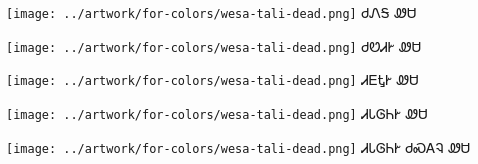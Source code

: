 \documentclass[avery5371,frame]{flashcards}%
\begin{document}
\begin{flashcard}{
\texttt{[image: ../artwork/for-colors/wesa-tali-dead.png]}
}
\Huge ᏧᏁᎦ ᏪᏌ
\end{flashcard}
\begin{flashcard}{
\texttt{[image: ../artwork/for-colors/wesa-tali-dead.png]}
}
\Huge ᏧᏬᏗᎨ ᏪᏌ
\end{flashcard}
\begin{flashcard}{
\texttt{[image: ../artwork/for-colors/wesa-tali-dead.png]}
}
\Huge ᏗᎬᎿᎨ ᏪᏌ
\end{flashcard}
\begin{flashcard}{
\texttt{[image: ../artwork/for-colors/wesa-tali-dead.png]}
}
\Huge ᏗᏓᎶᏂᎨ ᏪᏌ
\end{flashcard}
\begin{flashcard}{
\texttt{[image: ../artwork/for-colors/wesa-tali-dead.png]}
}
\Huge ᏗᏓᎶᏂᎨ ᏧᏍᎪᎸ ᏪᏌ
\end{flashcard}
\end{document}
